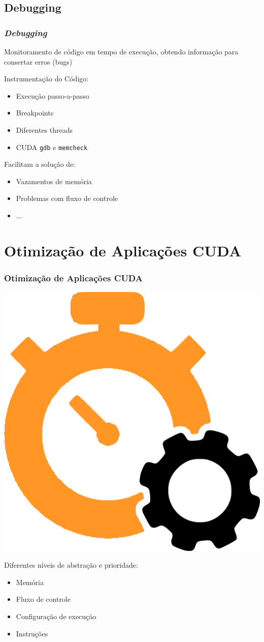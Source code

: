 \documentclass[10pt, compress]{beamer}
\begin{document}
\subsection{Debugging}

\begin{frame}
    \frametitle{\textit{Debugging}}
    Monitoramento de código \alert{em tempo de execução},
    obtendo informação para \alert{consertar erros} (\alert{bugs})
    \pause

    \alert{Instrumentação} do Código:
    \begin{itemize}
        \item Execução \alert{passo-a-passo}
            \pause
        \item \alert{Breakpoints}
            \pause
        \item Diferentes \alert{threads}
            \pause
        \item CUDA \texttt{\alert{gdb}} e \texttt{\alert{memcheck}}
    \end{itemize}
    \pause

    Facilitam a solução de:
    \begin{itemize}
        \item \alert{Vazamentos} de memória
            \pause
        \item Problemas com \alert{fluxo de controle}
            \pause
        \item ...
    \end{itemize}
\end{frame}

\section{Otimização de Aplicações CUDA}

\begin{frame}
    \frametitle{Otimização de Aplicações CUDA}
    \begin{center}
        \includegraphics[width=.2\textwidth]{optimization_icon}
    \end{center}

    Diferentes níveis de \alert{abstração} e \alert{prioridade}:
    \pause
    \begin{itemize}
        \item Memória
            \pause
        \item Fluxo de controle
            \pause
        \item Configuração de execução
            \pause
        \item Instruções
    \end{itemize}
\end{frame}
\end{document}
